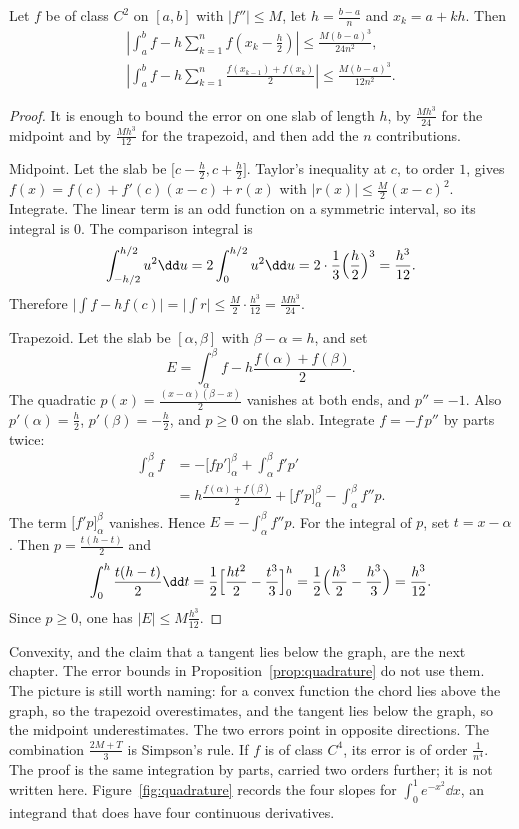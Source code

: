 \begin{proposition}\label{prop:quadrature}
Let $f$ be of class $C^2$ on $[a,b]$ with $|f''|\le M$, let $h=\frac{b-a}n$ and $x_k=a+kh$. Then
\[
\begin{gathered}
\left|\int_a^bf-h\sum_{k=1}^nf\!\left(x_k-\tfrac h2\right)\right|\le\frac{M(b-a)^3}{24n^2},\\
\left|\int_a^bf-h\sum_{k=1}^n\frac{f(x_{k-1})+f(x_k)}2\right|\le\frac{M(b-a)^3}{12n^2}.
\end{gathered}
\]
\end{proposition}
\begin{proof}
It is enough to bound the error on one slab of length $h$, by $\frac{Mh^3}{24}$ for the midpoint and by $\frac{Mh^3}{12}$ for the trapezoid, and then add the $n$ contributions.

Midpoint. Let the slab be $\bigl[c-\frac h2,c+\frac h2\bigr]$. Taylor's inequality at $c$, to order $1$, gives $f(x)=f(c)+f'(c)(x-c)+r(x)$ with $|r(x)|\le\frac M2(x-c)^2$. Integrate. The linear term is an odd function on a symmetric interval, so its integral is $0$. The comparison integral is
\[
\int_{-h/2}^{h/2}u^2\dd u=2\int_0^{h/2}u^2\dd u=2\cdot\frac1{3}\Bigl(\frac h2\Bigr)^3=\frac{h^3}{12}.
\]
Therefore $\bigl|\int f-hf(c)\bigr|=\bigl|\int r\bigr|\le\frac M2\cdot\frac{h^3}{12}=\frac{Mh^3}{24}$.

Trapezoid. Let the slab be $[\alpha,\beta]$ with $\beta-\alpha=h$, and set
\[
E=\int_\alpha^\beta f-h\frac{f(\alpha)+f(\beta)}2.
\]
The quadratic $p(x)=\frac{(x-\alpha)(\beta-x)}2$ vanishes at both ends, and $p''=-1$. Also $p'(\alpha)=\frac h2$, $p'(\beta)=-\frac h2$, and $p\ge0$ on the slab. Integrate $f=-f\,p''$ by parts twice:
\begin{align*}
\int_\alpha^\beta f
&=-\bigl[fp'\bigr]_\alpha^\beta+\int_\alpha^\beta f'p'\\
&=h\frac{f(\alpha)+f(\beta)}2+\bigl[f'p\bigr]_\alpha^\beta-\int_\alpha^\beta f''p.
\end{align*}
The term $\bigl[f'p\bigr]_\alpha^\beta$ vanishes. Hence $E=-\int_\alpha^\beta f''p$. For the integral of $p$, set $t=x-\alpha$. Then $p=\frac{t(h-t)}2$ and
\[
\int_0^h\frac{t(h-t)}2\dd t=\frac12\Bigl[\frac{ht^2}2-\frac{t^3}3\Bigr]_0^h=\frac12\Bigl(\frac{h^3}2-\frac{h^3}3\Bigr)=\frac{h^3}{12}.
\]
Since $p\ge0$, one has $|E|\le M\frac{h^3}{12}$.
\end{proof}

Convexity, and the claim that a tangent lies below the graph, are the next chapter. The error bounds in Proposition~\ref{prop:quadrature} do not use them. The picture is still worth naming: for a convex function the chord lies above the graph, so the trapezoid overestimates, and the tangent lies below the graph, so the midpoint underestimates. The two errors point in opposite directions. The combination $\frac{2M+T}3$ is Simpson's rule. If $f$ is of class $C^4$, its error is of order $\frac1{n^4}$. The proof is the same integration by parts, carried two orders further; it is not written here. Figure~\ref{fig:quadrature} records the four slopes for $\int_0^1 e^{-x^2}\dd x$, an integrand that does have four continuous derivatives.

